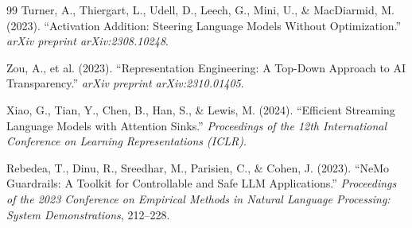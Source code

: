 \documentclass[a4paper,11pt]{article}
\begin{document}
\begin{thebibliography}{99}
Turner, A., Thiergart, L., Udell, D., Leech, G., Mini, U., \& MacDiarmid, M. (2023).
``Activation Addition: Steering Language Models Without Optimization.''
\textit{arXiv preprint arXiv:2308.10248}.

Zou, A., et al. (2023).
``Representation Engineering: A Top-Down Approach to AI Transparency.''
\textit{arXiv preprint arXiv:2310.01405}.

Xiao, G., Tian, Y., Chen, B., Han, S., \& Lewis, M. (2024).
``Efficient Streaming Language Models with Attention Sinks.''
\textit{Proceedings of the 12th International Conference on Learning Representations (ICLR)}.

Rebedea, T., Dinu, R., Sreedhar, M., Parisien, C., \& Cohen, J. (2023).
``NeMo Guardrails: A Toolkit for Controllable and Safe LLM Applications.''
\textit{Proceedings of the 2023 Conference on Empirical Methods in Natural Language Processing: System Demonstrations}, 212--228.

\end{thebibliography}
\end{document}
